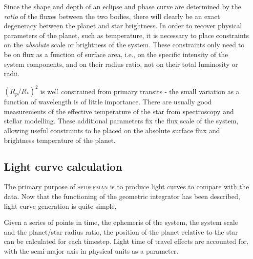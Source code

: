 \documentclass[a4paper,fleqn,usenatbib]{mnras}
\begin{document}
Since the shape and depth of an eclipse and phase curve are determined by the \emph{ratio} of the fluxes between the two bodies, there will clearly be an exact degeneracy between the planet and star brightness. In order to recover physical parameters of the planet, such as temperature, it is necessary to place constraints on the \emph{absolute} scale or brightness of the system. These constraints only need to be on flux as a function of surface area, i.e., on the specific intensity of the system components, and on their radius ratio, not on their total luminosity or radii.


$(R_p / R_*)^2$ is well constrained from primary transits - the small variation as a function of wavelength is of little importance. There are usually good measurements of the effective temperature of the star from spectroscopy and stellar modelling. These additional parameters fix the flux scale of the system, allowing useful constraints to be placed on the absolute surface flux and brightness temperature of the planet.

\subsection{Light curve calculation}\label{sec:lightcurve}

The primary purpose of \textsc{spiderman} is to produce light curves to compare with the data. Now that the functioning of the geometric integrator has been described, light curve generation is quite simple.

Given a series of points in time, the ephemeris of the system, the system scale and the planet/star radius ratio, the position of the planet relative to the star can be calculated for each timestep. Light time of travel effects are accounted for, with the semi-major axis in physical units as a parameter.
\end{document}
